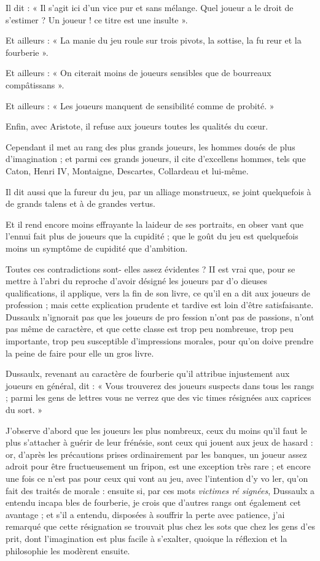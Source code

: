 Il dit : « Il s'agit ici d'un vice pur et
sans mélange. Quel joueur a le
droit de s'estimer ? Un joueur ! ce
titre est une insulte ».

Et ailleurs : « La manie du jeu roule
sur trois pivots, la sottise, la fu%
reur et la fourberie ».

Et ailleurs : « On citerait moins de
joueurs sensibles que de bourreaux
compâtissans ».

Et ailleurs : « Les joueurs manquent
de sensibilité comme de probité. »

Enfin, avec Aristote, il refuse aux
joueurs toutes les qualités du cœur.

Cependant il met au rang des plus
grands joueurs, les hommes doués
de plus d'imagination ; et parmi ces
grands joueurs, il cite d'excellens
hommes, tels que Caton, Henri IV,
Montaigne, Descartes, Collardeau et
lui-même.

Il dit aussi que la fureur du jeu,
par un alliage monstrueux, se joint
quelquefois à de grands talens et à
de grandes vertus.

Et il rend encore moins effrayante
la laideur de ses portraits, en obser%
vant que l'ennui fait plus de joueurs
que la cupidité ; que le goût du jeu
est quelquefois moins un symptôme
de cupidité que d'ambition.

Toutes ces contradictions sont-%
elles assez évidentes ? II est vrai que,
pour se mettre à l'abri du reproche
d'avoir désigné les joueurs par d'o%
dieuses qualifications, il applique,
vers la fin de son livre, ce qu'il en a
dit aux joueurs de profession ; mais
cette explication prudente et tardive
est loin d'être satisfaisante. Dussaulx
n'ignorait pas que les joueurs de pro%
fession n'ont pas de passions, n'ont
pas même de caractère, et que cette
classe est trop peu nombreuse, trop
peu importante, trop peu susceptible
d'impressions morales, pour qu'on
doive prendre la peine de faire pour
elle un gros livre.

Dussaulx, revenant au caractère de
fourberie qu'il attribue injustement
aux joueurs en général, dit : « Vous
trouverez des joueurs suspects dans
tous les rangs ; parmi les gens de
lettres vous ne verrez que des vic%
times résignées aux caprices du
sort. »

J'observe d'abord que les joueurs
les plus nombreux, ceux du moins
qu'il faut le plus s'attacher à guérir
de leur frénésie, sont ceux qui jouent
aux jeux de hasard : or, d'après les
précautions prises ordinairement par
les banques, un joueur assez adroit
pour être fructueusement un fripon,
est une exception très rare ; et encore
une fois ce n'est pas pour ceux qui
vont au jeu, avec l'intention d'y vo%
ler, qu'on fait des traités de morale :
ensuite si, par ces mots \emph{victimes ré%
signées}, Dussaulx a entendu incapa%
bles de fourberie, je crois que d'autres
rangs ont également cet avantage ;
et s'il a entendu, disposées à souffrir
la perte avec patience, j'ai remarqué
que cette résignation se trouvait plus
chez les sots que chez les gens d'es%
prit, dont l'imagination est plus facile
à s'exalter, quoique la réflexion et la
philosophie les modèrent ensuite.

